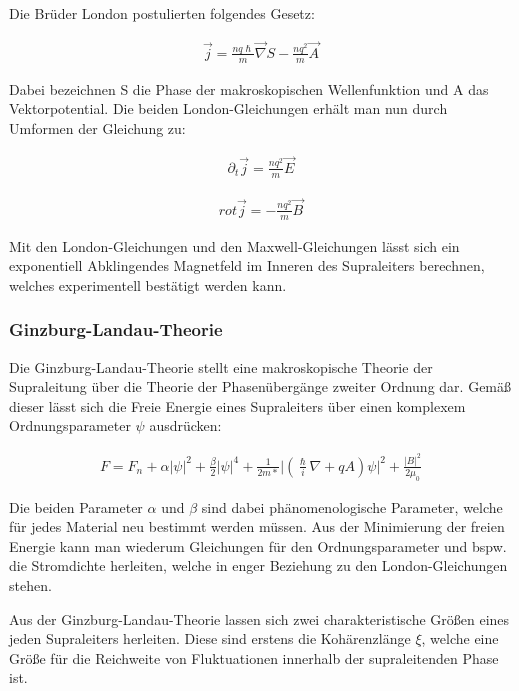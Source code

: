 Die Brüder London postulierten folgendes Gesetz:

\begin{align}
\overrightarrow{j}=\frac{nq\hslash}{m}\overrightarrow{\nabla}S - \frac{nq^{2}}{m}\overrightarrow{A}
\end{align}

Dabei bezeichnen S die Phase der makroskopischen Wellenfunktion und A das Vektorpotential. Die beiden London-Gleichungen erhält man nun durch Umformen der Gleichung zu:

\begin{align}
\partial_t \overrightarrow{j}=\frac{nq^2}{m}\overrightarrow{E}
\end{align}

\begin{align}
rot \overrightarrow{j}=-\frac{nq^2}{m}\overrightarrow{B}
\end{align}

Mit den London-Gleichungen und den Maxwell-Gleichungen lässt sich ein exponentiell Abklingendes Magnetfeld im Inneren des Supraleiters berechnen, welches experimentell bestätigt werden kann. 


\subsubsection{Ginzburg-Landau-Theorie}\label{ginzburg}

Die Ginzburg-Landau-Theorie stellt eine makroskopische Theorie der Supraleitung über die Theorie der Phasenübergänge zweiter Ordnung dar. Gemäß dieser lässt sich die Freie Energie eines Supraleiters über einen komplexem Ordnungsparameter $\psi$ ausdrücken:

\begin{align}
F=F_n + \alpha \vert\psi\vert^2 +\frac{\beta}{2}\vert\psi\vert^4+\frac{1}{2m*}\vert\left(\frac{\hslash}{i}\nabla +qA\right)\psi\vert^2 + \frac{\vert B \vert^2}{2\mu_0}
\end{align}

Die beiden Parameter $\alpha$ und $\beta$ sind dabei phänomenologische Parameter, welche für jedes Material neu bestimmt werden müssen. Aus der Minimierung der freien Energie kann man wiederum Gleichungen für den Ordnungsparameter und bspw. die Stromdichte herleiten, welche in enger Beziehung zu den London-Gleichungen stehen. 

Aus der Ginzburg-Landau-Theorie lassen sich zwei charakteristische Größen eines jeden Supraleiters herleiten. Diese sind erstens die Kohärenzlänge $\xi$, welche eine Größe für die Reichweite von Fluktuationen innerhalb der supraleitenden Phase ist.

